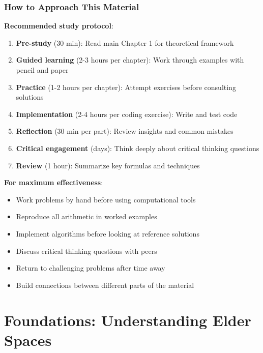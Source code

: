 \documentclass[12pt,a4paper,openany]{book}
\theoremstyle{definition}
\theoremstyle{remark}
\begin{document}
\section*{How to Approach This Material}

\textbf{Recommended study protocol}:

\begin{enumerate}
\item \textbf{Pre-study} (30 min): Read main Chapter 1 for theoretical framework
\item \textbf{Guided learning} (2-3 hours per chapter): Work through examples with pencil and paper
\item \textbf{Practice} (1-2 hours per chapter): Attempt exercises before consulting solutions
\item \textbf{Implementation} (2-4 hours per coding exercise): Write and test code
\item \textbf{Reflection} (30 min per part): Review insights and common mistakes
\item \textbf{Critical engagement} (days): Think deeply about critical thinking questions
\item \textbf{Review} (1 hour): Summarize key formulas and techniques
\end{enumerate}

\textbf{For maximum effectiveness}:
\begin{itemize}
\item Work problems by hand before using computational tools
\item Reproduce all arithmetic in worked examples
\item Implement algorithms before looking at reference solutions
\item Discuss critical thinking questions with peers
\item Return to challenging problems after time away
\item Build connections between different parts of the material
\end{itemize}

\mainmatter

\part{Foundations: Understanding Elder Spaces}



\end{document}
